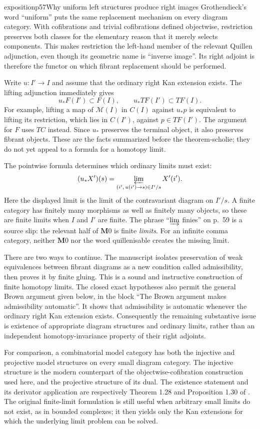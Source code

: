 \begin{dcomment}{exposition}{p57}{Why uniform left structures produce right images}
Grothendieck's word ``uniform'' puts the same replacement mechanism on every diagram category. With cofibrations and trivial cofibrations defined objectwise, restriction preserves both classes for the elementary reason that it merely selects components. This makes restriction the left-hand member of the relevant Quillen adjunction, even though its geometric name is ``inverse image''. Its right adjoint is therefore the functor on which fibrant replacement should be performed.

Write $u:I'\to I$ and assume that the ordinary right Kan extension exists. The lifting adjunction immediately gives
\[
 u_*F(I')\subset F(I),\qquad u_*TF(I')\subset TF(I).
\]
For example, lifting a map of $\mathcal M(I)$ in $C(I)$ against $u_*p$ is equivalent to lifting its restriction, which lies in $C(I')$, against $p\in TF(I')$. The argument for $F$ uses $TC$ instead. Since $u_*$ preserves the terminal object, it also preserves fibrant objects. These are the facts summarized before the theorem-scholie; they do not yet appeal to a formula for a homotopy limit.

The pointwise formula determines which ordinary limits must exist:
\[
 (u_*X')(s)=\varprojlim_{(i',\,u(i')\to s)\in I'/s}X'(i').
\]
Here the displayed limit is the limit of the contravariant diagram on $I'/s$. A finite category has finitely many morphisms as well as finitely many objects, so these are finite limits when $I$ and $I'$ are finite. The phrase ``$\varinjlim$ finies'' on p.~59 is a source slip: the relevant half of $\mathbf M0$ is finite \emph{limits}. For an infinite comma category, neither $\mathbf M0$ nor the word quillenisable creates the missing limit.

There are two ways to continue. The manuscript isolates preservation of weak equivalences between fibrant diagrams as a new condition called admissibility, then proves it by finite gluing. This is a sound and instructive construction of finite homotopy limits. The closed exact hypotheses also permit the general Brown argument given below, in the block ``The Brown argument makes admissibility automatic''. It shows that admissibility is automatic whenever the ordinary right Kan extension exists. Consequently the remaining substantive issue is existence of appropriate diagram structures and ordinary limits, rather than an independent homotopy-invariance property of their right adjoints.

For comparison, a combinatorial model category has both the injective and projective model structures on every small diagram category. The injective structure is the modern counterpart of the objectwise-cofibration construction used here, and the projective structure of its dual. The existence statement and its derivator application are respectively Theorem 1.28 and Proposition 1.30 of \citet{Groth2013}. The original finite-limit formulation is still useful when arbitrary small limits do not exist, as in bounded complexes; it then yields only the Kan extensions for which the underlying limit problem can be solved.
\end{dcomment}

